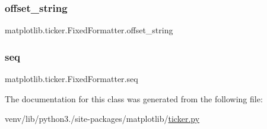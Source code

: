 \subsubsection{\texorpdfstring{offset\+\_\+string}{offset\_string}}
{\footnotesize\ttfamily matplotlib.\+ticker.\+Fixed\+Formatter.\+offset\+\_\+string}

\mbox{\label{classmatplotlib_1_1ticker_1_1FixedFormatter_a9d84c4cba6efcea9477feab1161103cd}} 
\subsubsection{\texorpdfstring{seq}{seq}}
{\footnotesize\ttfamily matplotlib.\+ticker.\+Fixed\+Formatter.\+seq}



The documentation for this class was generated from the following file\+:\begin{DoxyCompactItemize}
\item 
venv/lib/python3./site-\/packages/matplotlib/\hyperlink{ticker_8py}{ticker.\+py}\end{DoxyCompactItemize}
